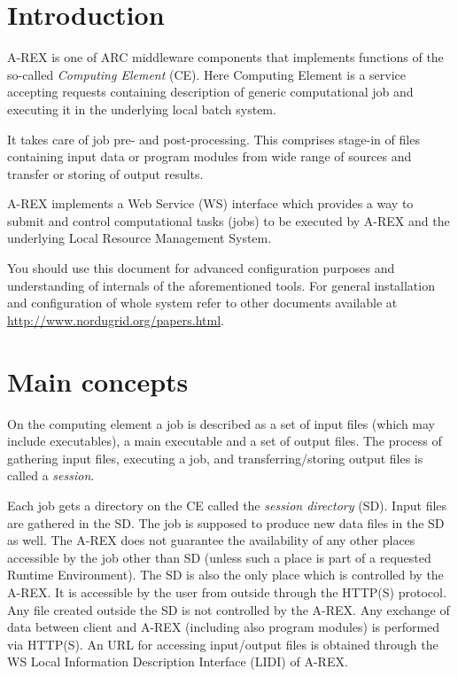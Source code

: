 \documentclass{article}                            %
\begin{document}
\newpage
\section{Introduction\label{sec:intro}}

A-REX is one of ARC middleware components that implements functions
of the so-called \emph{Computing Element} (CE). Here Computing Element
is a service accepting requests containing description of generic
computational job and executing it in the underlying local batch system. 

It takes care of job pre- and post-processing. This comprises
stage-in of files containing input data or program modules from wide
range of sources and transfer or storing of output results.

A-REX implements a Web Service (WS) interface which provides a
way to submit and control computational tasks (jobs) to be executed
by A-REX and the underlying Local Resource Management System.

\begin{framed}You should use this document for advanced configuration purposes
and understanding of internals of the aforementioned tools. For general
installation and configuration of whole system refer to other documents
available at \url{http://www.nordugrid.org/papers.html}.
\end{framed}

\section{Main concepts\label{sec:main concepts}}

On the computing element a job is described as a set of input files
(which may include executables), a main executable and a set of output
files. The process of gathering input files, executing a job, and
transferring/storing output files is called a \emph{session}.

Each job gets a directory on the CE called the \emph{session directory}
(SD). Input files are gathered in the SD. The job is supposed to produce
new data files in the SD as well. The A-REX does not guarantee the
availability of any other places accessible by the job other than
SD (unless such a place is part of a requested Runtime Environment).
The SD is also the only place which is controlled by the A-REX. It
is accessible by the user from outside through the HTTP(S) protocol.
Any file created outside the SD is not controlled by the A-REX. Any
exchange of data between client and A-REX (including also program
modules) is performed via HTTP(S). An URL for accessing input/output
files is  obtained through the WS Local Information Description Interface
(LIDI) of A-REX.
\end{document}
